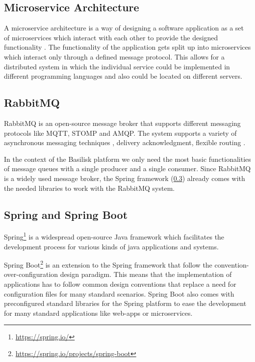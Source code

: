 \subsection{Microservice Architecture}
\label{sec:microservice_architecture}
A microservice architecture is a way of designing a software application as a set of microservices which interact with each other to provide the designed functionality \cite{dragoniMicroservicesYesterdayToday2017, MicroservicesHttpsMartinfowler}.
The functionality of the application gets split up into microservices which interact only through a defined message protocol.
This allows for a distributed system in which the individual service could be implemented in different programming languages and also could be located on different servers.


\subsection{RabbitMQ}
\label{sec:rabbitmq}
RabbitMQ is an open-source message broker that supports different messaging protocols like MQTT, STOMP and AMQP.
The system supports a variety of asynchronous messaging techniques \eg, delivery acknowledgment, flexible routing \cite{RabbitMQWebsiteHttps}.

In the context of the Basilisk platform we only need the most basic functionalities of message queues with a single producer and a single consumer.
Since RabbitMQ is a widely used message broker, the Spring framework (\ref{sec:spring}) already comes with the needed libraries to work with the RabbitMQ system.


\subsection{Spring and Spring Boot}
\label{sec:spring}
Spring\footnote{\url{https://spring.io/}} is a widespread open-source Java framework which facilitates the development process for various kinds of java applications and systems.

Spring Boot\footnote{\url{https://spring.io/projects/spring-boot}} is an extension to the Spring framework that follow the convention-over-configuration design paradigm.
This means that the implementation of applications has to follow common design conventions that replace a need for configuration files for many standard scenarios.
Spring Boot also comes with preconfigured standard libraries for the Spring platform to ease the development for many standard applications like web-apps or microservices.

